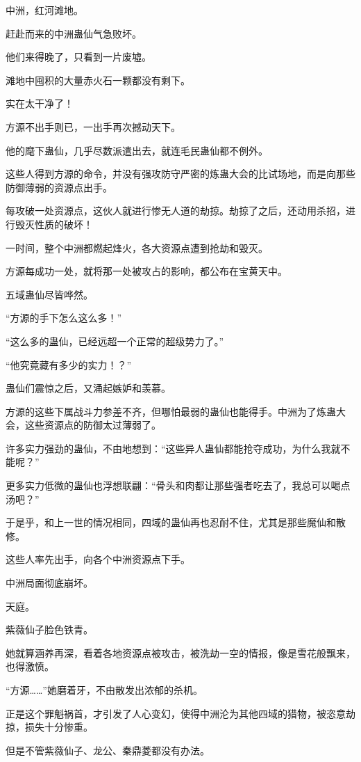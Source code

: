 \begin{this_body}
中洲，红河滩地。

赶赴而来的中洲蛊仙气急败坏。

他们来得晚了，只看到一片废墟。

滩地中囤积的大量赤火石一颗都没有剩下。

实在太干净了！

方源不出手则已，一出手再次撼动天下。

他的麾下蛊仙，几乎尽数派遣出去，就连毛民蛊仙都不例外。

这些人得到方源的命令，并没有强攻防守严密的炼蛊大会的比试场地，而是向那些防御薄弱的资源点出手。

每攻破一处资源点，这伙人就进行惨无人道的劫掠。劫掠了之后，还动用杀招，进行毁灭性质的破坏！

一时间，整个中洲都燃起烽火，各大资源点遭到抢劫和毁灭。

方源每成功一处，就将那一处被攻占的影响，都公布在宝黄天中。

五域蛊仙尽皆哗然。

“方源的手下怎么这么多！”

“这么多的蛊仙，已经远超一个正常的超级势力了。”

“他究竟藏有多少的实力！？”

蛊仙们震惊之后，又涌起嫉妒和羡慕。

方源的这些下属战斗力参差不齐，但哪怕最弱的蛊仙也能得手。中洲为了炼蛊大会，这些资源点的防御太过薄弱了。

许多实力强劲的蛊仙，不由地想到：“这些异人蛊仙都能抢夺成功，为什么我就不能呢？”

更多实力低微的蛊仙也浮想联翩：“骨头和肉都让那些强者吃去了，我总可以喝点汤吧？”

于是乎，和上一世的情况相同，四域的蛊仙再也忍耐不住，尤其是那些魔仙和散修。

这些人率先出手，向各个中洲资源点下手。

中洲局面彻底崩坏。

天庭。

紫薇仙子脸色铁青。

她就算涵养再深，看着各地资源点被攻击，被洗劫一空的情报，像是雪花般飘来，也得激愤。

“方源……”她磨着牙，不由散发出浓郁的杀机。

正是这个罪魁祸首，才引发了人心变幻，使得中洲沦为其他四域的猎物，被恣意劫掠，损失十分惨重。

但是不管紫薇仙子、龙公、秦鼎菱都没有办法。


\end{this_body}
